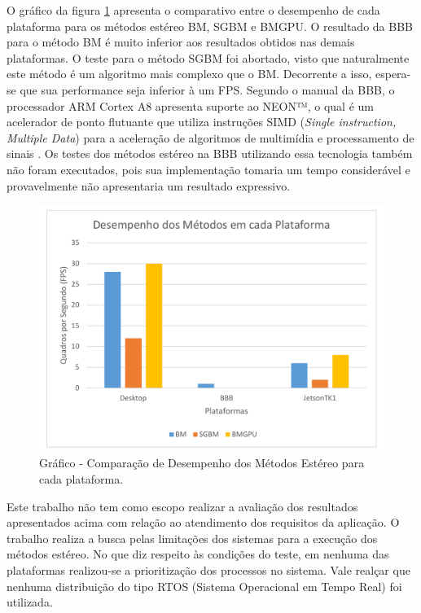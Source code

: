 O gráfico da figura \ref{grafico_desempenho} apresenta o comparativo entre o desempenho de cada plataforma para os métodos estéreo BM, SGBM e BMGPU. O resultado da BBB para o método BM é muito inferior aos resultados obtidos nas demais plataformas. O teste para o método SGBM foi abortado, visto que naturalmente este método é um algoritmo mais complexo que o BM. Decorrente a isso, espera-se que sua performance seja inferior à um FPS. Segundo o manual da BBB, o processador ARM Cortex A8 apresenta suporte ao NEON™, o qual é um acelerador de ponto flutuante que utiliza instruções SIMD (\textit{Single instruction, Multiple Data}) para a aceleração de algoritmos de multimídia e processamento de sinais \cite{ARMNEON}. Os testes dos métodos estéreo na BBB utilizando essa tecnologia também não foram executados, pois sua implementação tomaria um tempo considerável e provavelmente não apresentaria um resultado expressivo. 

\begin{figure}[H]
 	\centering
 	\includegraphics[scale=0.5]{./Resources/grafico_desempenho.pdf}
 	\caption{Gráfico - Comparação de Desempenho dos Métodos Estéreo para cada plataforma.}
 	\label{grafico_desempenho}
\end{figure}

Este trabalho não tem como escopo realizar a avaliação dos resultados apresentados acima com relação ao atendimento dos requisitos da aplicação. O trabalho realiza a busca pelas limitações dos sistemas para a execução dos métodos estéreo. No que diz respeito às condições do teste, em nenhuma das plataformas realizou-se a prioritização dos processos no sistema. Vale realçar que nenhuma distribuição do tipo RTOS (Sistema Operacional em Tempo Real) foi utilizada.

